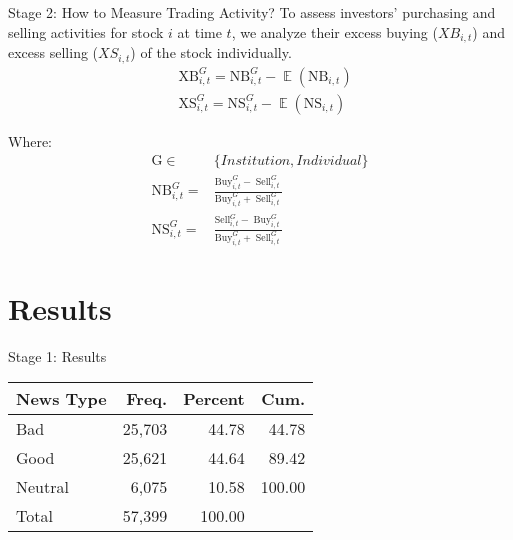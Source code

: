 \documentclass{beamer}
\DeclareMathOperator{\E}{\mathbb{E}} %
\begin{document}
\begin{frame}{Stage 2: How to Measure Trading Activity?}
    To assess investors' purchasing and selling activities for stock \(i\) at time \(t\), we analyze their excess buying (\(XB_{i,t}\)) and excess selling (\(XS_{i,t}\)) of the stock individually.
    \[
        \begin{aligned}
             & \mathrm{XB}_{i, t}^G=\mathrm{NB}_{i, t}^G-\E\left(\mathrm{NB}_{i, t}\right) \\
             & \mathrm{XS}_{i, t}^G=\mathrm{NS}_{i, t}^G-\E\left(\mathrm{NS}_{i, t}\right)
        \end{aligned}
    \]

    Where:
    \[
        \begin{aligned}
            \mathrm{G}                     \in & \{Institution, Individual\}                                                                                     \\
            \mathrm{NB}_{i, t}^G=              & \frac{\mathrm{Buy}_{i, t}^G -\operatorname{Sell}_{i, t}^G}{\mathrm{Buy}_{i, t}^G +\operatorname{Sell}_{i, t}^G} \\
            \mathrm{NS}_{i, t}^G=              & \frac{\mathrm{Sell}_{i, t}^G -\operatorname{Buy}_{i, t}^G}{\mathrm{Buy}_{i, t}^G +\operatorname{Sell}_{i, t}^G}
        \end{aligned}
    \]

\end{frame}







\section{Results}



\begin{frame}{Stage 1: Results}

    \center
    \begin{tabular}{lrrr}
        \toprule
        News Type & Freq.  & Percent & Cum.   \\
        \midrule
        Bad       & 25,703 & 44.78   & 44.78  \\
        Good      & 25,621 & 44.64   & 89.42  \\
        Neutral   & 6,075  & 10.58   & 100.00 \\
        \midrule
        Total     & 57,399 & 100.00  &        \\
        \bottomrule
    \end{tabular}


\end{frame}
\end{document}

